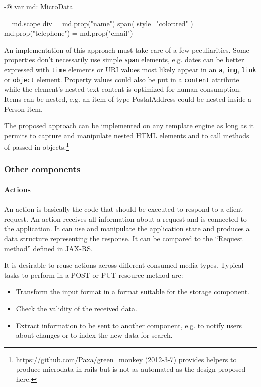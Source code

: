 \documentclass[12pt,a4paper,twoside]{scrartcl}		%
\newcommand{\citeurl}[2]{\url{#1} (#2)}
\begin{document}
\begin{anylisting}[label=fig:microdata-template,
                   caption={Using a Microdata-aware data structure in a template}]
-@ var md: MicroData

= md.scope
  div
    = md.prop("name")
      span( style="color:red" )
    = md.prop("telephone")
    = md.prop("email")
\end{anylisting}

An implementation of this approach must take care of a few
peculiarities\cite{Hickson2011}. Some properties don't necessarily use simple
\lstinline:span: elements, e.g. dates can be better expressed with
\lstinline:time: elements or URI values most likely appear in an
\lstinline:a:, \lstinline:img:, \lstinline:link: or \lstinline:object:
element. Property values could also be put in a \lstinline:content: attribute
while the element's nested text content is optimized for human
consumption. Items can be nested, e.g. an item of type PostalAddress could be
nested inside a Person item.

The proposed approach can be implemented on any template engine as long as it
permits to capture and manipulate nested HTML elements and to call methods of
passed in
objects.\footnote{\citeurl{https://github.com/Paxa/green_monkey}{2012-3-7}
  provides helpers to produce microdata in rails but is not as automated as the
  design proposed here.}

\subsubsection{Other components}

\paragraph{Actions}
\label{sec:components-actions}

An action is basically the code that should be executed to respond to a client
request. An action receives all information about a request and is connected to
the application. It can use and manipulate the application state and produces a
data structure representing the response. It can be compared to the ``Request
method'' defined in JAX-RS.


It is desirable to reuse actions across different consumed media types. Typical
tasks to perform in a POST or PUT resource method are:
\begin{itemize}
\item Transform the input format in a format suitable for the storage component.
\item Check the validity of the received data.
\item Extract information to be sent to another component, e.g. to notify users
  about changes or to index the new data for search.
\end{itemize}
\end{document}
